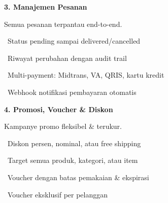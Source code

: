\documentclass[a4paper]{article}
\begin{document}
\vspace{8pt}

\noindent
\begin{minipage}[t]{0.485\textwidth}
    \colorbox{PurplePrimary}{%
        \begin{minipage}{\dimexpr\textwidth-2\fboxsep\relax}
            {\fontsize{10}{13}\selectfont\bfseries\color{White} 3. Manajemen Pesanan}
        \end{minipage}}\par
    \vspace{4pt}
    {\fontsize{9}{12}\selectfont\color{TextDark}%
    Semua pesanan terpantau end-to-end.\par\vspace{3pt}
    \textbullet\ Status pending sampai delivered/cancelled\par\vspace{2pt}%
    \textbullet\ Riwayat perubahan dengan audit trail\par\vspace{2pt}%
    \textbullet\ Multi-payment: Midtrans, VA, QRIS, kartu kredit\par\vspace{2pt}%
    \textbullet\ Webhook notifikasi pembayaran otomatis}%
\end{minipage}%
\hfill
\begin{minipage}[t]{0.485\textwidth}
    \colorbox{BlueDark}{%
        \begin{minipage}{\dimexpr\textwidth-2\fboxsep\relax}
            {\fontsize{10}{13}\selectfont\bfseries\color{White} 4. Promosi, Voucher \& Diskon}
        \end{minipage}}\par
    \vspace{4pt}
    {\fontsize{9}{12}\selectfont\color{TextDark}%
    Kampanye promo fleksibel \& terukur.\par\vspace{3pt}
    \textbullet\ Diskon persen, nominal, atau free shipping\par\vspace{2pt}%
    \textbullet\ Target semua produk, kategori, atau item\par\vspace{2pt}%
    \textbullet\ Voucher dengan batas pemakaian \& ekspirasi\par\vspace{2pt}%
    \textbullet\ Voucher eksklusif per pelanggan}%
\end{minipage}
\end{document}

